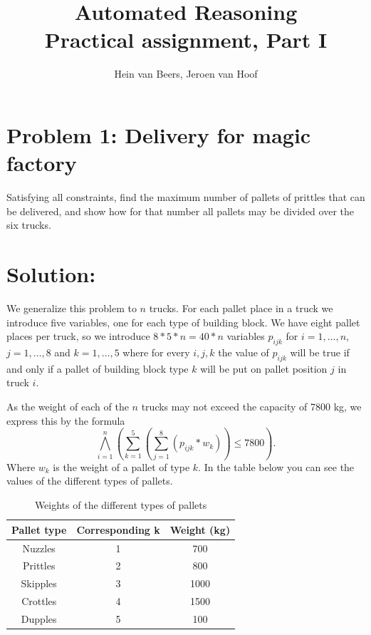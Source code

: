 \documentclass[a4paper]{article}
\author{Hein van Beers, Jeroen van Hoof}
\title{Automated Reasoning\\
	 \large Practical assignment, Part I}
\begin{document}
	\maketitle
	
	\section*{Problem 1: Delivery for magic factory}
	Satisfying all constraints, find the maximum number of pallets of prittles that can be delivered, and show how for that number all pallets may be divided over the six trucks.

	
	\section*{Solution:}
	We generalize this problem to $n$ trucks. For each pallet place in a truck we introduce five variables, one for each type of building block. We have eight pallet places per truck, so we introduce $8*5*n = 40*n$ variables $p_{ijk}$ for $i = 1,\ldots,n$, $j = 1,\ldots,8$ and $k = 1,\ldots,5$ where for every $i,j,k$ the value of $p_{ijk}$ will be true if and only if a pallet of building block type $k$ will be put on pallet position $j$ in truck $i$.
	
	As the weight of each of the $n$ trucks may not exceed the capacity of 7800 kg, we express this by the formula
\[ \bigwedge_{i=1}^n (\sum_{k=1}^5 (\sum_{j=1}^8 (p_{ijk}*w_k)) \leq 7800).\]
Where $w_k$ is the weight of a pallet of type $k$. In the table below you can see the values of the different types of pallets.

\begin{table}[H]
\centering
\caption{Weights of the different types of pallets}
\label{my-label}
\begin{tabular}{c|c|c}
\textbf{Pallet type} & \textbf{Corresponding k} & \textbf{Weight (kg)} \\ \hline
Nuzzles              & 1                        & 700                  \\ \hline
Prittles             & 2                        & 800                  \\ \hline
Skipples             & 3                        & 1000                 \\ \hline
Crottles             & 4                        & 1500                 \\ \hline
Dupples              & 5                        & 100                 
\end{tabular}
\end{table}
\end{document}
